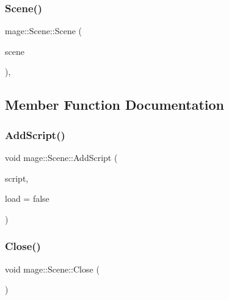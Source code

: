 \hypertarget{classmage_1_1_scene_a084284387b472f4eaf421509ef267b34}{}\label{classmage_1_1_scene_a084284387b472f4eaf421509ef267b34} 
\subsubsection{\texorpdfstring{Scene()}{Scene()}\hspace{0.1cm}{\footnotesize\ttfamily [3/3]}}
{\footnotesize\ttfamily mage\+::\+Scene\+::\+Scene (\begin{DoxyParamCaption}\item[{\hyperlink{classmage_1_1_scene}{Scene} \&\&}]{scene }\end{DoxyParamCaption})\hspace{0.3cm}{\ttfamily [private]}, {\ttfamily [delete]}}



\subsection{Member Function Documentation}
\hypertarget{classmage_1_1_scene_aa98dbf063994948dd2e434c7f0f6ee06}{}\label{classmage_1_1_scene_aa98dbf063994948dd2e434c7f0f6ee06} 
\subsubsection{\texorpdfstring{Add\+Script()}{AddScript()}}
{\footnotesize\ttfamily void mage\+::\+Scene\+::\+Add\+Script (\begin{DoxyParamCaption}\item[{\hyperlink{namespacemage_a1e01ae66713838a7a67d30e44c67703e}{Shared\+Ptr}$<$ \hyperlink{classmage_1_1_behavior_script}{Behavior\+Script} $>$}]{script,  }\item[{bool}]{load = {\ttfamily false} }\end{DoxyParamCaption})}

\hypertarget{classmage_1_1_scene_afcdedaac5ecab7dcbbb180426054aaa5}{}\label{classmage_1_1_scene_afcdedaac5ecab7dcbbb180426054aaa5} 
\subsubsection{\texorpdfstring{Close()}{Close()}}
{\footnotesize\ttfamily void mage\+::\+Scene\+::\+Close (\begin{DoxyParamCaption}{ }\end{DoxyParamCaption})\hspace{0.3cm}{\ttfamily [virtual]}}

